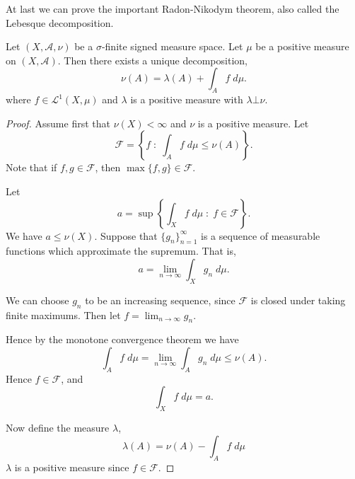 \documentclass{owmaths}
\begin{document}
At last we can prove the important Radon-Nikodym theorem, also
called the Lebesque decomposition.
\begin{proposition}
    Let $(X,\mathcal{A},\nu)$ be a $\sigma$-finite signed measure space. Let
    $\mu$ be a positive measure on $(X,\mathcal{A})$. Then there exists a
    unique decomposition,
    \begin{equation*}
        \nu(A) = \lambda(A) + \int_A f\;d\mu.
    \end{equation*}
    where $f \in \mathcal{L}^1(X,\mu)$ and $\lambda$ is a positive measure with $\lambda \bot \nu$.
\end{proposition}
\begin{proof}
    Assume first that $\nu(X) < \infty$ and $\nu$ is a positive measure.
    Let
    \begin{equation*}
        \mathcal{F} = \left\{f \;:\; \int_A f\;d\mu \leq \nu(A)\right\}.
    \end{equation*}
    Note that if $f,g \in \mathcal{F}$, then $\max\{f,g\} \in \mathcal{F}$.
    
    Let
    \begin{equation*}
        a = \sup\left\{\int_X f\;d\mu \;:\; f \in \mathcal{F}\right\}.
    \end{equation*}
    We have $a \leq \nu(X)$. Suppose that $\{g_n\}_{n=1}^\infty$
    is a sequence of measurable functions which approximate the supremum. That is,
    \begin{equation*}
        a = \lim_{n\rightarrow\infty} \int_X g_n\;d\mu.
    \end{equation*}
    
    We can choose $g_n$ to be an increasing sequence, since $\mathcal{F}$
    is closed under taking finite maximums. Then let $f = \lim_{n\rightarrow\infty} g_n$.
    
    Hence by the monotone convergence theorem we have
    \begin{equation*}
        \int_A f\;d\mu = \lim_{n\rightarrow\infty} \int_A g_n\;d\mu \leq \nu(A).
    \end{equation*}
    Hence $f \in \mathcal{F}$, and
    \begin{equation*}
        \int_X f\;d\mu = a.
    \end{equation*}
    
    
    Now define the measure $\lambda$,
    \begin{equation*}
        \lambda(A) = \nu(A) - \int_Af\;d\mu
    \end{equation*}
    $\lambda$ is a positive measure since $f \in \mathcal{F}$.
    

\end{proof}
\end{document}
